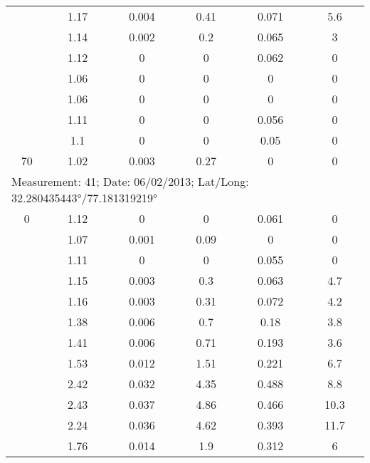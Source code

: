 \begin{longtable}{cccccc}
		& 1.17  & 0.004 & 0.41  & 0.071 & 5.6 \\
		
		& 1.14  & 0.002 & 0.2   & 0.065 & 3 \\
		
		& 1.12  & 0     & 0     & 0.062 & 0 \\
		
		& 1.06  & 0     & 0     & 0     & 0 \\
		
		& 1.06  & 0     & 0     & 0     & 0 \\
		
		& 1.11  & 0     & 0     & 0.056 & 0 \\
		
		& 1.1   & 0     & 0     & 0.05  & 0 \\
		
		70    & 1.02  & 0.003 & 0.27  & 0     & 0 \\		
		
		\multicolumn{6}{l}{Measurement: 41; Date: 06/02/2013; 
			Lat/Long: 32.280435443°/77.181319219°} \\		
		\midrule 	
		0     & 1.12  & 0     & 0     & 0.061 & 0 \\
		
		& 1.07  & 0.001 & 0.09  & 0     & 0 \\
		
		& 1.11  & 0     & 0     & 0.055 & 0 \\
		
		& 1.15  & 0.003 & 0.3   & 0.063 & 4.7 \\
		
		& 1.16  & 0.003 & 0.31  & 0.072 & 4.2 \\
		
		& 1.38  & 0.006 & 0.7   & 0.18  & 3.8 \\
		
		& 1.41  & 0.006 & 0.71  & 0.193 & 3.6 \\
		
		& 1.53  & 0.012 & 1.51  & 0.221 & 6.7 \\
		
		& 2.42  & 0.032 & 4.35  & 0.488 & 8.8 \\
		
		& 2.43  & 0.037 & 4.86  & 0.466 & 10.3 \\
		
		& 2.24  & 0.036 & 4.62  & 0.393 & 11.7 \\
		
		& 1.76  & 0.014 & 1.9   & 0.312 & 6 \\
		

\end{longtable}
